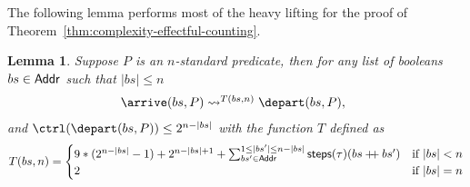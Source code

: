 \documentclass[12pt,phd,lfcs,twoside,openright,logo,leftchapter,normalheadings]{infthesis}
\theoremstyle{plain}
\newtheorem{lemma}[theorem]{Lemma}
\theoremstyle{definition}
\begin{document}
The following lemma performs most of the heavy lifting for the proof
of Theorem~\ref{thm:complexity-effectful-counting}.
%
\begin{lemma}\label{lem:inductive-bit-of-thm1}
  Suppose $P$ is an $n$-standard predicate, then for any list of
  booleans $bs \in \mathsf{Addr}$ such that $|bs| \leq n$
  \[
    \ba{@{}l}
      \arrive(bs, P) \reducesto^{T(bs, n)} \depart(bs, P),
    \ea
  \]
  and $\ctrl(\depart(bs, P)) \leq 2^{n - |bs|}$ with the
  function $T$ defined as
  \[
    T(bs, n) =
     \begin{cases}
       9*(2^{n - |bs|} - 1) + 2^{n - |bs| + 1} + \sum_{bs' \in \mathsf{Addr}}^{1 \leq |bs'| \leq n - |bs|}\mathsf{steps}(\tau)(bs \mathbin{+\!\!+} bs') & \text{if } |bs| < n\\
       2            & \text{if } |bs| = n
     \end{cases}
   \]

\end{lemma}
%
%
\end{document}
